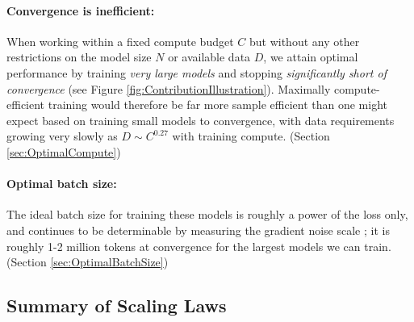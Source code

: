 \documentclass[english]{article}
\begin{document}
\paragraph{Convergence is inefficient:} When working within a fixed compute budget $C$ but without any other restrictions on the model size $N$ or available data $D$, we attain optimal performance by training \emph{very large models} and stopping \emph{significantly short of convergence} (see Figure \ref{fig:ContributionIllustration}).  Maximally compute-efficient training would therefore be far more sample efficient than one might expect based on training small models to convergence, with data requirements growing very slowly as $D \sim C^{0.27}$ with training compute. (Section \ref{sec:OptimalCompute})

\paragraph{Optimal batch size:} The ideal batch size for training these models is roughly a power of the loss only, and continues to be determinable by measuring the gradient noise scale \cite{1812.06162}; it is roughly 1-2 million tokens at convergence for the largest models we can train. (Section \ref{sec:OptimalBatchSize})

\subsection{Summary of Scaling Laws}
\end{document}
